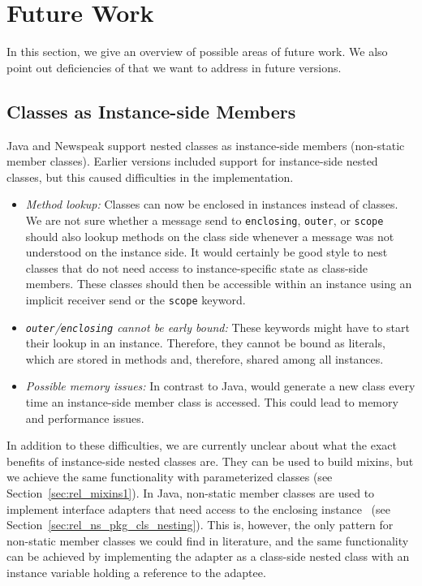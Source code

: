 \chapter{Future Work}
\label{sec:future}
In this section, we give an overview of possible areas of future work. We also point out deficiencies of \msname that we want to address in future versions.

\section{Classes as Instance-side Members}
\label{sec:future_inst_side}
Java and Newspeak support nested classes as instance-side members (non-static member classes). Earlier versions \msname included support for instance-side nested classes, but this caused difficulties in the implementation. 

\begin{itemize}
	\item \emph{Method lookup:} Classes can now be enclosed in instances instead of classes. We are not sure whether a message send to \texttt{enclosing}, \texttt{outer}, or \texttt{scope} should also lookup methods on the class side whenever a message was not understood on the instance side. It would certainly be good style to nest classes that do not need access to instance-specific state as class-side members. These classes should then be accessible within an instance using an implicit receiver send or the \texttt{scope} keyword.
	\item \emph{\texttt{outer}/\texttt{enclosing} cannot be early bound:} These keywords might have to start their lookup in an instance. Therefore, they cannot be bound as literals, which are stored in methods and, therefore, shared among all instances.
	\item \emph{Possible memory issues:} In contrast to Java, \msname would generate a new class every time an instance-side member class is accessed. This could lead to memory and performance issues.
\end{itemize}

In addition to these difficulties, we are currently unclear about what the exact benefits of instance-side nested classes are. They can be used to build mixins, but we achieve the same functionality with parameterized classes (see Section~\ref{sec:rel_mixins1}). In Java, non-static member classes are used to implement interface adapters that need access to the enclosing instance~\cite{Bloch:2008:EJ:1377533} (see Section~\ref{sec:rel_ns_pkg_cls_nesting}). This is, however, the only pattern for non-static member classes we could find in literature, and the same functionality can be achieved by implementing the adapter as a class-side nested class with an instance variable holding a reference to the adaptee.

